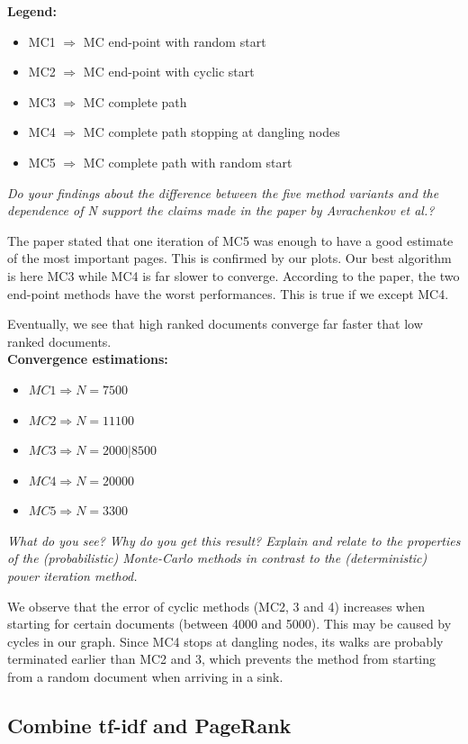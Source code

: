\begin{itemize}
\textbf{Legend:}
\begin{itemize}
\item MC1 $\Rightarrow$ MC end-point with random start
\item MC2 $\Rightarrow$ MC end-point with cyclic start
\item MC3 $\Rightarrow$ MC complete path
\item MC4 $\Rightarrow$ MC complete path stopping at dangling nodes
\item MC5 $\Rightarrow$ MC complete path with random start
\end{itemize}

\textit{Do your findings about the difference between the five method variants and the dependence of N support the claims made in the paper by Avrachenkov et al.?}

The paper stated that one iteration of MC5 was enough to have a good estimate of the most important pages. This is confirmed by our plots. Our best algorithm is here MC3 while MC4 is far slower to converge.
According to the paper, the two end-point methods have the worst performances. This is true if we except MC4.

Eventually, we see that high ranked documents converge far faster that low ranked documents.\\


\textbf{Convergence estimations:}
\begin{itemize}
\item $ MC1 \Rightarrow N = 7500 $
\item $ MC2 \Rightarrow N = 11100 $
\item $ MC3 \Rightarrow N = 2000 | 8500 $
\item $ MC4 \Rightarrow N = 20000 $
\item $ MC5 \Rightarrow N = 3300 $
\end{itemize}


\textit{What do you see? Why do you get this result? Explain and relate to the properties of the (probabilistic) Monte-Carlo methods in contrast to the (deterministic) power iteration method.}

We observe that the error of cyclic methods (MC2, 3 and 4) increases when starting for certain documents (between 4000 and 5000). This may be caused by cycles in our graph. Since MC4 stops at dangling nodes, its walks are probably terminated earlier than MC2 and 3, which prevents the method from starting from a random document when arriving in a sink.

\subsection{Combine tf-idf and PageRank}


\end{itemize}

